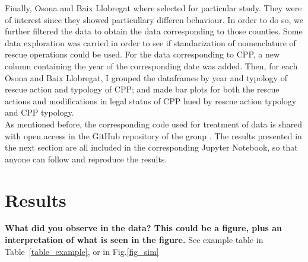 \documentclass[
  journal=small,
  manuscript=mini-article,  %
  year=2023,
  volume=1,
]{odj-journal}
\begin{document}
Finally, Osona and Baix Llobregat where selected for particular study. They were of interest since they showed particullary differen behaviour. In order to do so, we further filtered the data to obtain the data corresponding to those counties. Some data exploration was carried in order to see if standarization of nomenclature of rescue operations could be used. For the data corresponding to CPP, a new column containing the year of the corresponding date was added. Then, for each Osona and Baix Llobregat, I grouped the dataframes by year and typology of rescue action and typology of CPP; and made bar plots for both the rescue actions and modifications in legal status of CPP hued by rescue action typology and CPP typology.\\

As mentioned before, the corresponding code used for treatment of data is shared with open access in the GitHub repository of the group \cite{github_repo}. The results presented in the next section are all included in the corresponding Jupyter Notebook, so that anyone can follow and reproduce the results.

\section{Results}
\textbf{What did you observe in the data? This could be a figure, plus an interpretation of what is seen in the figure.} See example table in Table~\ref{table_example}, or in Fig.\ref{fig_sim}\lipsum[1]
\end{document}
